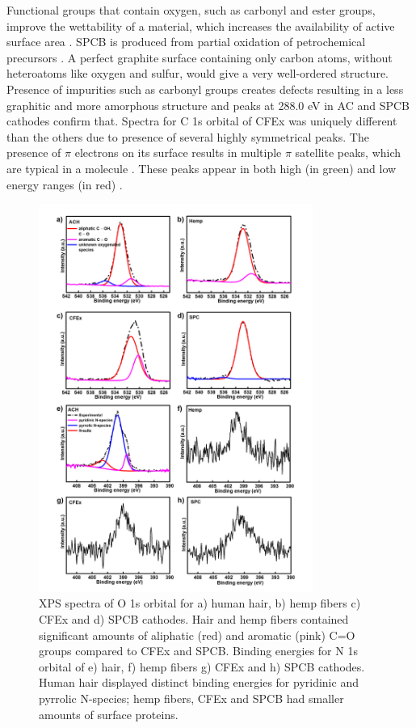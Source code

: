 \documentclass{article}
\begin{document}
Functional groups that contain oxygen, such as carbonyl and ester groups, improve the wettability of a material, which increases the availability of active surface area \cite{younesi_analysis_2015}. SPCB is produced from partial oxidation of petrochemical precursors \cite{gnanamuthu_electrochemical_2011}. A perfect graphite surface containing only carbon atoms, without heteroatoms like oxygen and sulfur, would give a very well-ordered structure. Presence of impurities such as carbonyl groups creates defects resulting in a less graphitic and more amorphous structure\cite{hao_carbonaceous_2013} and peaks at 288.0 eV in AC and SPCB cathodes confirm that. Spectra for C 1s orbital of CFEx was uniquely different than the others due to presence of several highly symmetrical peaks. The presence of $\pi$ electrons on its surface results in  multiple $\pi$ satellite peaks, which are typical in a  molecule \cite{skryleva_xps_2016}. These peaks appear in both high (in green) and low energy ranges (in red) \cite{erbahar_spectromicroscopy_2016, poirier_carbon_1993}. 

\begin{figure}[h!]
  \centering
  \includegraphics[width=0.8\textwidth]{fig/XPSON}
    \caption{XPS spectra of O 1s orbital for a) human hair, b) hemp fibers c) CFEx and d) SPCB cathodes. Hair and hemp fibers contained significant amounts of aliphatic (red) and aromatic (pink) C=O groups  compared to CFEx and SPCB. Binding energies for N 1s orbital of e) hair, f) hemp fibers g) CFEx and h) SPCB cathodes. Human hair displayed distinct binding energies for pyridinic and pyrrolic N-species; hemp fibers, CFEx and SPCB had smaller amounts of surface proteins.}
  \label{fig:XPSON}
\end{figure}
\end{document}
